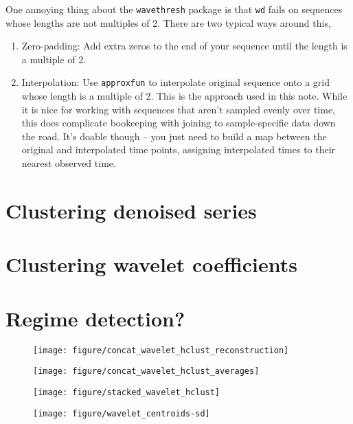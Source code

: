 \documentclass{article}
\begin{document}
One annoying thing about the \texttt{wavethresh} package is that \texttt{wd}
fails on sequences whose lengths are not multiples of 2. There are two typical ways around this,

\begin{enumerate}
\item Zero-padding: Add extra zeros to the end of your sequence until the length is a multiple of 2.
\item Interpolation: Use \texttt{approxfun} to interpolate original sequence
  onto a grid whose length is a multiple of 2. This is the approach used in this
  note. While it is nice for working with sequences that aren't sampled evenly
  over time, this does complicate bookeeping with joining to sample-specific
  data down the road. It's doable though -- you just need to build a map between
  the original and interpolated time points, assigning interpolated times to
  their nearest observed time.
\end{enumerate}

\section{Clustering denoised series}

\section{Clustering wavelet coefficients}

\section{Regime detection?}

\begin{figure}[ht]
  \centering
  \texttt{[image: figure/concat\_wavelet\_hclust\_reconstruction]}
  \caption{\label{fig:label} }
\end{figure}

\begin{figure}[ht]
  \centering
  \texttt{[image: figure/concat\_wavelet\_hclust\_averages]}
  \caption{\label{fig:label} }
\end{figure}

\begin{figure}[ht]
  \centering
  \texttt{[image: figure/stacked\_wavelet\_hclust]}
  \caption{\label{fig:label} }
\end{figure}

\begin{figure}[ht]
  \centering
  \texttt{[image: figure/wavelet\_centroids-sd]}
  \caption{\label{fig:label} }
\end{figure}
\end{document}
